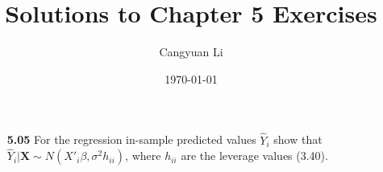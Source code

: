 \documentclass[14pt]{extreport}
\title{Solutions to Chapter 5 Exercises}
\author{Cangyuan Li}
\date{\today}
\begin{document}
    
\maketitle

\begin{enumerate}
    \item [\textbf{5.05}] For the regression in-sample predicted values \( \widehat{Y}_i \) show that 
    \( \widehat{Y}_i | \mathbf{X} \sim N(X'_i\beta, \sigma^2h_{ii}) \), where \( h_{ii} \) are the leverage values (3.40). 
\end{enumerate}
\end{document}
